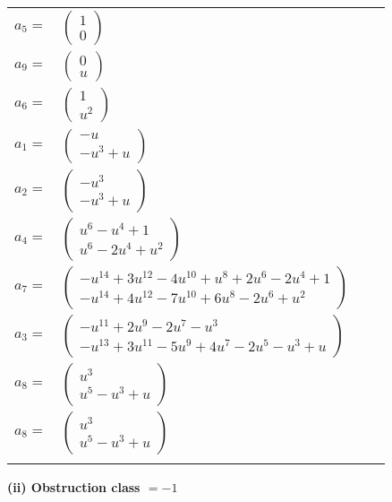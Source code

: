 \documentclass[1p]{elsarticle_modified}
\theoremstyle{definition}
\begin{document}
\begin{tabular}{m{7pt} m{180pt} m{7pt} m{180pt} }
\flushright $a_{5}=$&$\begin{pmatrix}1\\0\end{pmatrix}$ \\
\flushright $a_{9}=$&$\begin{pmatrix}0\\u\end{pmatrix}$ \\
\flushright $a_{6}=$&$\begin{pmatrix}1\\u^2\end{pmatrix}$ \\
\flushright $a_{1}=$&$\begin{pmatrix}- u\\- u^3+u\end{pmatrix}$ \\
\flushright $a_{2}=$&$\begin{pmatrix}- u^3\\- u^3+u\end{pmatrix}$ \\
\flushright $a_{4}=$&$\begin{pmatrix}u^6- u^4+1\\u^6-2 u^4+u^2\end{pmatrix}$ \\
\flushright $a_{7}=$&$\begin{pmatrix}- u^{14}+3 u^{12}-4 u^{10}+u^8+2 u^6-2 u^4+1\\- u^{14}+4 u^{12}-7 u^{10}+6 u^8-2 u^6+u^2\end{pmatrix}$ \\
\flushright $a_{3}=$&$\begin{pmatrix}- u^{11}+2 u^9-2 u^7- u^3\\- u^{13}+3 u^{11}-5 u^9+4 u^7-2 u^5- u^3+u\end{pmatrix}$ \\
\flushright $a_{8}=$&$\begin{pmatrix}u^3\\u^5- u^3+u\end{pmatrix}$\\ \flushright $a_{8}=$&$\begin{pmatrix}u^3\\u^5- u^3+u\end{pmatrix}$\\&\end{tabular}
\flushleft \textbf{(ii) Obstruction class $= -1$}\\~\\
\end{document}
